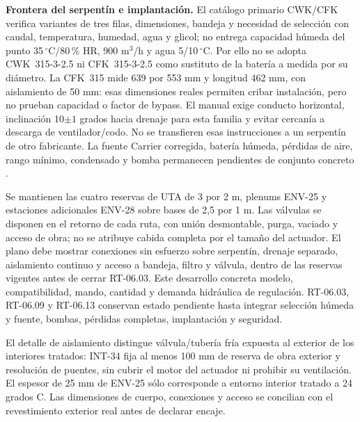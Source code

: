 \textbf{Frontera del serpentín e implantación.} El catálogo primario CWK/CFK verifica variantes de tres filas, dimensiones, bandeja y necesidad de selección con caudal, temperatura, humedad, agua y glicol; no entrega capacidad húmeda del punto 35\,$^{\circ}$C/80\,\% HR, 900 m$^3$/h y agua 5/10\,$^{\circ}$C. Por ello no se adopta CWK~315-3-2.5 ni CFK~315-3-2.5 como sustituto de la batería a medida por su diámetro. La CFK~315 mide 639 por 553 mm y longitud 462 mm, con aislamiento de 50 mm: esas dimensiones reales permiten cribar instalación, pero no prueban capacidad o factor de bypass. El manual exige conducto horizontal, inclinación 10$\pm1$ grados hacia drenaje para esta familia y evitar cercanía a descarga de ventilador/codo. No se transfieren esas instrucciones a un serpentín de otro fabricante. La fuente Carrier corregida, batería húmeda, pérdidas de aire, rango mínimo, condensado y bomba permanecen pendientes de conjunto concreto \parencite[pp.~2--5]{lote31-cwk-catalogo}\parencite[p.~3]{lote31-cwk-manual}.

Se mantienen las cuatro reservas de UTA de 3 por 2 m, plenums ENV-25 y estaciones adicionales ENV-28 sobre bases de 2,5 por 1 m. Las válvulas se disponen en el retorno de cada ruta, con unión desmontable, purga, vaciado y acceso de obra; no se atribuye cabida completa por el tamaño del actuador. El plano debe mostrar conexiones sin esfuerzo sobre serpentín, drenaje separado, aislamiento continuo y acceso a bandeja, filtro y válvula, dentro de las reservas vigentes antes de cerrar RT-06.03. Este desarrollo concreta modelo, compatibilidad, mando, cantidad y demanda hidráulica de regulación. RT-06.03, RT-06.09 y RT-06.13 conservan estado pendiente hasta integrar selección húmeda y fuente, bombas, pérdidas completas, implantación y seguridad.

El detalle de aislamiento distingue válvula/tubería fría expuesta al exterior de los interiores tratados: INT-34 fija al menos 100 mm de reserva de obra exterior y resolución de puentes, sin cubrir el motor del actuador ni prohibir su ventilación. El espesor de 25 mm de ENV-25 sólo corresponde a entorno interior tratado a 24 grados C. Las dimensiones de cuerpo, conexiones y acceso se concilian con el revestimiento exterior real antes de declarar encaje.
